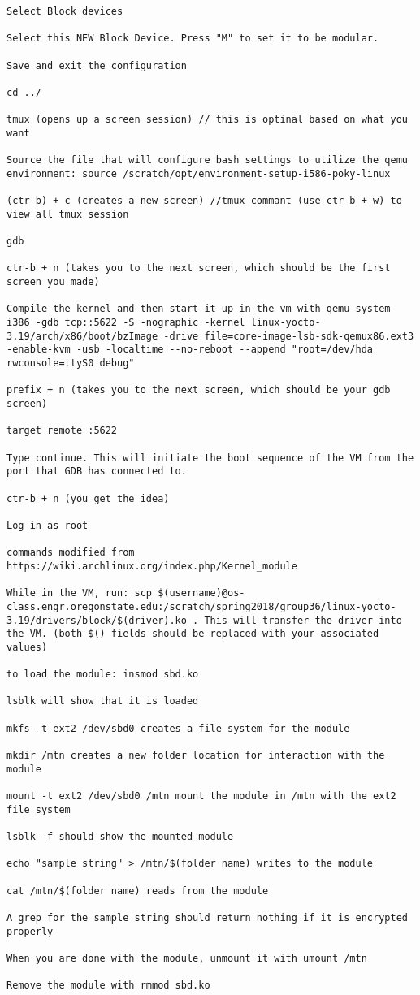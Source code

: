 \documentclass[onecolumn, draftclsnofoot,10pt, compsoc]{IEEEtran}
\begin{document}
\begin{verbatim}
Select Block devices

Select this NEW Block Device. Press "M" to set it to be modular.

Save and exit the configuration

cd ../

tmux (opens up a screen session) // this is optinal based on what you want

Source the file that will configure bash settings to utilize the qemu environment: source /scratch/opt/environment-setup-i586-poky-linux

(ctr-b) + c (creates a new screen) //tmux commant (use ctr-b + w) to view all tmux session

gdb

ctr-b + n (takes you to the next screen, which should be the first screen you made)

Compile the kernel and then start it up in the vm with qemu-system-i386 -gdb tcp::5622 -S -nographic -kernel linux-yocto-3.19/arch/x86/boot/bzImage -drive file=core-image-lsb-sdk-qemux86.ext3 -enable-kvm -usb -localtime --no-reboot --append "root=/dev/hda rwconsole=ttyS0 debug"

prefix + n (takes you to the next screen, which should be your gdb screen)

target remote :5622

Type continue. This will initiate the boot sequence of the VM from the port that GDB has connected to.

ctr-b + n (you get the idea)

Log in as root

commands modified from https://wiki.archlinux.org/index.php/Kernel_module

While in the VM, run: scp $(username)@os-class.engr.oregonstate.edu:/scratch/spring2018/group36/linux-yocto-3.19/drivers/block/$(driver).ko . This will transfer the driver into the VM. (both $() fields should be replaced with your associated values)

to load the module: insmod sbd.ko

lsblk will show that it is loaded

mkfs -t ext2 /dev/sbd0 creates a file system for the module

mkdir /mtn creates a new folder location for interaction with the module

mount -t ext2 /dev/sbd0 /mtn mount the module in /mtn with the ext2 file system

lsblk -f should show the mounted module

echo "sample string" > /mtn/$(folder name) writes to the module

cat /mtn/$(folder name) reads from the module

A grep for the sample string should return nothing if it is encrypted properly

When you are done with the module, unmount it with umount /mtn
 
Remove the module with rmmod sbd.ko
\end{verbatim}
\end{document}
